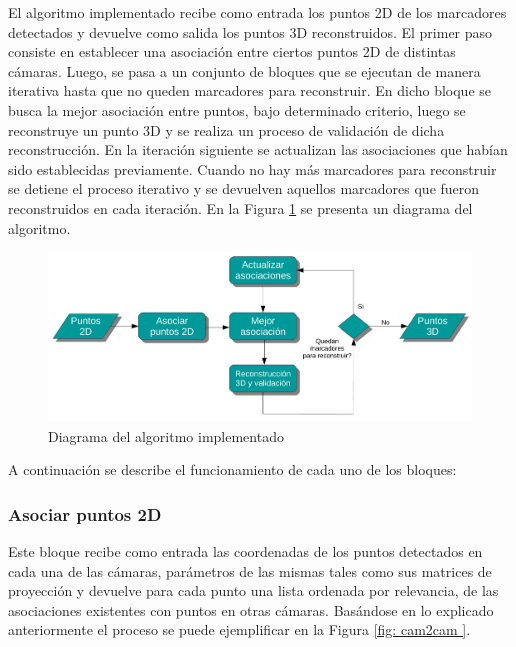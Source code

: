 El algoritmo implementado recibe como entrada los puntos 2D de los marcadores detectados y devuelve como salida los puntos 3D reconstruidos. El primer paso consiste en establecer una asociación entre ciertos puntos 2D de distintas cámaras. Luego, se pasa a un conjunto de bloques que se ejecutan de manera iterativa hasta que no queden marcadores para reconstruir. En dicho bloque se busca la mejor asociación entre puntos, bajo determinado criterio, luego se reconstruye un punto 3D y se realiza un proceso de validación de dicha reconstrucción. En la iteración siguiente se actualizan las asociaciones que habían sido establecidas previamente. Cuando no hay más marcadores para reconstruir se detiene el proceso iterativo y se devuelven aquellos marcadores que fueron reconstruidos en cada iteración. En la Figura \ref{fig: diagrama algoritmo} se presenta un diagrama del algoritmo.\\

\begin{figure}[ht!]
\hspace{-1cm}
\includegraphics[scale=0.55]{img/Reconstruccion/diagrama_algoritmo.pdf}
\caption{Diagrama del algoritmo implementado}
\label{fig: diagrama algoritmo}
\end{figure}

A continuación se describe el funcionamiento de cada uno de los bloques:

\subsubsection{Asociar puntos 2D}

Este bloque recibe como entrada las coordenadas de los puntos detectados en cada una de las cámaras, parámetros de las mismas tales como sus matrices de proyección y devuelve para cada punto una lista ordenada por relevancia, de las asociaciones existentes con puntos en otras cámaras.
Basándose en lo explicado anteriormente el proceso  se puede ejemplificar  en la Figura \ref{fig: cam2cam }. \\

